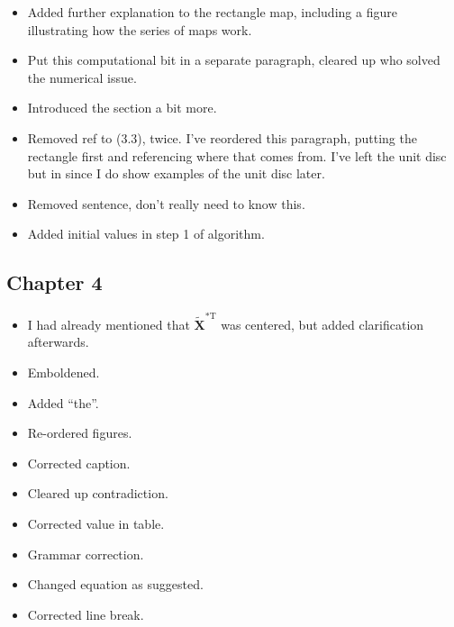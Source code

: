 \begin{itemize}
\item {} Added further explanation to the rectangle map, including a figure illustrating how the series of maps work.
\item {} Put this computational bit in a separate paragraph, cleared up who solved the numerical issue.
\item {} Introduced the section a bit more.
\item {} Removed ref to (3.3), twice.  I've reordered this paragraph, putting the rectangle first and referencing where that comes from. I've left the unit disc but in since I do show examples of the unit disc later. 
\item {} Removed sentence, don't really need to know this.
\item {} Added initial values in step 1 of algorithm.
\end{itemize}

\subsection{Chapter 4}
\begin{itemize}
\item {} I had already mentioned that $\tilde{\mathbf{X}}^{*\text{T}}$ was centered, but added clarification afterwards.
\item {} Emboldened.
\item {} Added ``the''.
\item {} Re-ordered figures.
\item {} Corrected caption.
\item {} Cleared up contradiction.
\item {} Corrected value in table.
\item {} Grammar correction.
\item {} Changed equation as suggested.
\item {} Corrected line break.
\end{itemize}

